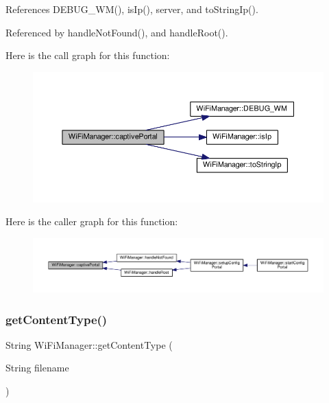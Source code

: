 References D\+E\+B\+U\+G\+\_\+\+W\+M(), is\+Ip(), server, and to\+String\+Ip().



Referenced by handle\+Not\+Found(), and handle\+Root().

Here is the call graph for this function\+:\nopagebreak
\begin{figure}[H]
\begin{center}
\leavevmode
\includegraphics[width=350pt]{d4/dc8/class_wi_fi_manager_a4ef4298deb224212e5242c456669a973_cgraph}
\end{center}
\end{figure}
Here is the caller graph for this function\+:\nopagebreak
\begin{figure}[H]
\begin{center}
\leavevmode
\includegraphics[width=350pt]{d4/dc8/class_wi_fi_manager_a4ef4298deb224212e5242c456669a973_icgraph}
\end{center}
\end{figure}
\mbox{\label{class_wi_fi_manager_a40f123fd290c3e331c9785d19a88f3b8}} 
\subsubsection{\texorpdfstring{get\+Content\+Type()}{getContentType()}}
{\footnotesize\ttfamily String Wi\+Fi\+Manager\+::get\+Content\+Type (\begin{DoxyParamCaption}\item[{String}]{filename }\end{DoxyParamCaption})\hspace{0.3cm}{\ttfamily [private]}}



